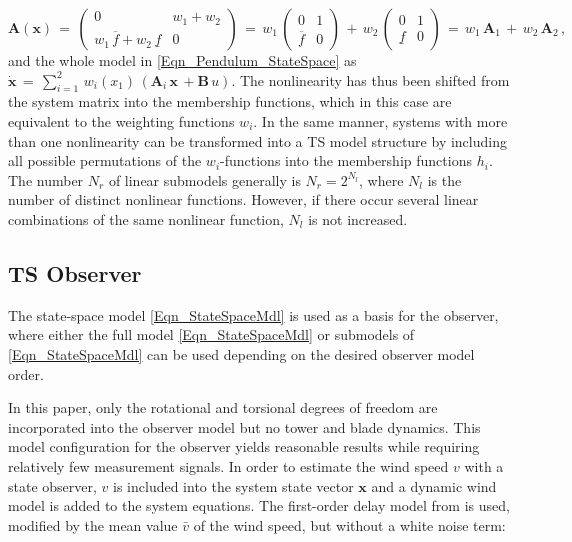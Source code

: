 \documentclass[a4paper]{article}
\newcommand{\xP}{\dot{x}}
\newcommand{\B}[1]{\mathbf{#1}}
\newcommand{\fmax}{\overline{f}}
\newcommand{\fmin}{\underline{f}}
\begin{document}
\begin{equation}
\B{A}\left(\B{x}\right) \, = \, \begin{pmatrix} 0 & w_1 + w_2 \\ w_1\,\fmax + w_2\,\fmin & 0 \end{pmatrix} \,
							= \, w_1\,\begin{pmatrix} 0 & 1 \\ \fmax  & 0 \end{pmatrix} \, + \, w_2\,\begin{pmatrix} 0 & 1 \\ \fmin  & 0 \end{pmatrix} \, 
							= \, w_1\,\B{A}_1 \, + \,w_2\, \B{A}_2 \, ,
\label{Eqn_TS_Pendulum}
\end{equation}
\newline and the whole model in \eqref{Eqn_Pendulum_StateSpace} as $\B{\xP} \, = \, \sum_{i=1}^2 \, w_i(x_1)\, \left(\B{A}_i \, \B{x} \, + \B{B} \, u\right)$.
\newline The nonlinearity has thus been shifted from the system matrix into the membership functions, which in this case are equivalent to the weighting functions $w_i$. In the same manner, systems with more than one nonlinearity can be transformed into a TS model structure by including all possible permutations of the $w_i$-functions into the membership functions $h_i$. The number $N_r$ of linear submodels generally is $N_r = 2^{N_l}$, where $N_l$ is the number of distinct nonlinear functions. However, if there occur several linear combinations of the same nonlinear function, $N_l$ is not increased.



\subsection{TS Observer}


The state-space model \eqref{Eqn_StateSpaceMdl} is used as a basis for the observer, where either the full model \eqref{Eqn_StateSpaceMdl} or submodels of \eqref{Eqn_StateSpaceMdl} can be used depending on the desired observer model order.

In this paper, only the rotational and torsional degrees of freedom are incorporated into the observer model but no tower and blade dynamics. This model configuration for the observer yields reasonable results while requiring relatively few measurement signals.
\newline In order to estimate the wind speed $v$ with a state observer, $v$ is included into the system state vector $\B{x}$ and a dynamic wind model is added to the system equations. The first-order delay model from \cite{Ekelund:1994} is used, modified by the mean value $\bar{v}$ of the wind speed, but without a white noise term:
\end{document}
